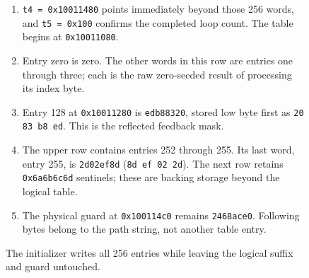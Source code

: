 \begin{figure}[htbp]
\begin{minipage}{\linewidth}
\begin{enumerate}
      \item \texttt{t4 = 0x10011480} points immediately beyond those 256 words, and \texttt{t5 = 0x100} confirms the completed loop count. The table begins at \texttt{0x10011080}.
      \item Entry zero is zero. The other words in this row are entries one through three; each is the raw zero-seeded result of processing its index byte.
      \item Entry 128 at \texttt{0x10011280} is \texttt{edb88320}, stored low byte first as \texttt{20 83 b8 ed}. This is the reflected feedback mask.
      \item The upper row contains entries 252 through 255. Its last word, entry 255, is \texttt{2d02ef8d} (\texttt{8d ef 02 2d}). The next row retains \texttt{0x6a6b6c6d} sentinels; these are backing storage beyond the logical table.
      \item The physical guard at \texttt{0x100114c0} remains \texttt{2468ace0}. Following bytes belong to the path string, not another table entry.
    \end{enumerate}
  \end{minipage}
  \caption{The initializer writes all 256 entries while leaving the logical suffix and guard untouched.}
  \label{capture:024-crc32-f02}
  \label{crc-f02}
\end{figure}
\par
